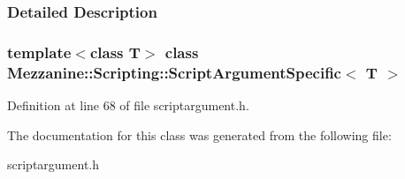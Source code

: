 \subsubsection{Detailed Description}
\subsubsection*{template$<$class T$>$ class Mezzanine::Scripting::ScriptArgumentSpecific$<$ T $>$}



Definition at line 68 of file scriptargument.h.



The documentation for this class was generated from the following file:\begin{DoxyCompactItemize}
\item 
scriptargument.h\end{DoxyCompactItemize}
